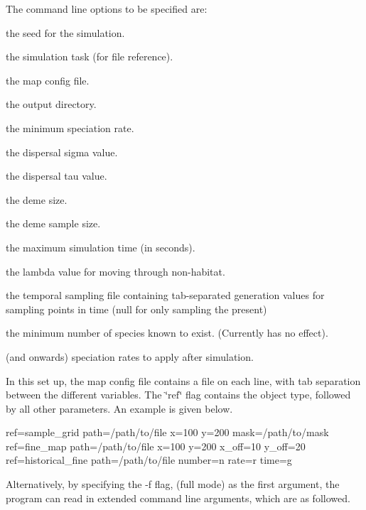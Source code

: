 The command line options to be specified are\+:


\begin{DoxyEnumerate}
\item the seed for the simulation.
\item the simulation task (for file reference).
\item the map config file.
\item the output directory.
\item the minimum speciation rate.
\item the dispersal sigma value.
\item the dispersal tau value.
\item the deme size.
\item the deme sample size.
\item the maximum simulation time (in seconds).
\item the lambda value for moving through non-\/habitat.
\item the temporal sampling file containing tab-\/separated generation values for sampling points in time (null for only sampling the present)
\item the minimum number of species known to exist. (Currently has no effect).
\item (and onwards) speciation rates to apply after simulation.
\end{DoxyEnumerate}

In this set up, the map config file contains a file on each line, with tab separation between the different variables. The \char`\"{}ref\char`\"{} flag contains the object type, followed by all other parameters. An example is given below.

ref=sample\+\_\+grid path=/path/to/file x=100 y=200 mask=/path/to/mask ref=fine\+\_\+map path=/path/to/file x=100 y=200 x\+\_\+off=10 y\+\_\+off=20 ref=historical\+\_\+fine path=/path/to/file number=n rate=r time=g

Alternatively, by specifying the -\/f flag, (full mode) as the first argument, the program can read in extended command line arguments, which are as followed.


